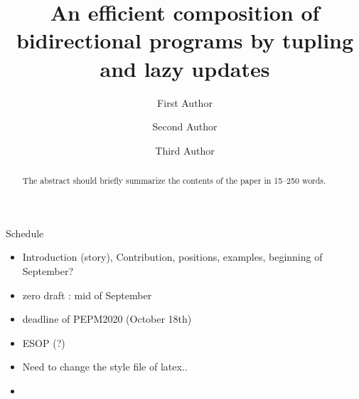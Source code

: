 \documentclass[runningheads]{llncs}
\begin{document}
%
\title{An efficient composition of bidirectional programs
  by tupling and lazy updates 
}
%
%
\author{First Author \and
Second Author \and
Third Author}
%
%
%
\maketitle              %
%
\begin{abstract}
The abstract should briefly summarize the contents of the paper in
15--250 words.

\end{abstract}
%
%
%

Schedule
\begin{itemize}

\item Introduction (story), Contribution, positions, examples, beginning of September?
\item zero draft : mid of September 
  
\item deadline of PEPM2020 (October 18th)
\item ESOP (?)
\item Need to change the style file of latex..
\item []
\end{itemize}
\end{document}
